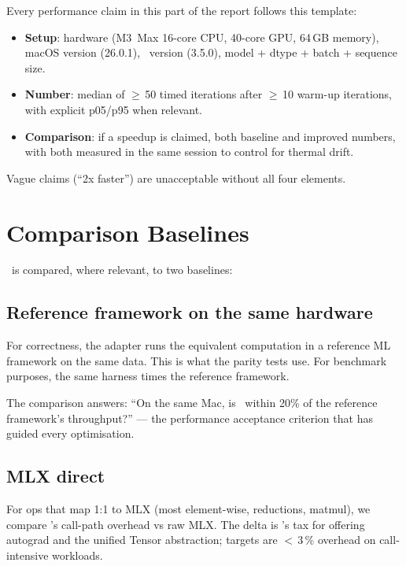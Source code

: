 Every performance claim in this part of the report follows this
template:

\begin{itemize}
  \item \textbf{Setup}: hardware (M3~Max 16-core CPU, 40-core
    GPU, 64\,GB memory), macOS version (26.0.1), \Lucid\
    version (3.5.0), model + dtype + batch + sequence size.
  \item \textbf{Number}: median of $\geq$\,50 timed iterations
    after $\geq$\,10 warm-up iterations, with explicit p05/p95
    when relevant.
  \item \textbf{Comparison}: if a speedup is claimed, both
    baseline and improved numbers, with both measured in the
    same session to control for thermal drift.
\end{itemize}

Vague claims (``2x faster'') are unacceptable without all four
elements.

\section{Comparison Baselines}
\label{sec:perf_methodology:baselines}

\Lucid\ is compared, where relevant, to two baselines:

\subsection{Reference framework on the same hardware}
\label{ssec:perf_methodology:ref_framework}

For correctness, the 
adapter runs the equivalent computation in a reference ML
framework on the same data. This is what the parity tests use.
For benchmark purposes, the same harness times the reference
framework.

The comparison answers: ``On the same Mac, is \Lucid\ within
20\% of the reference framework's throughput?'' --- the
performance acceptance criterion that has guided every
optimisation.

\subsection{MLX direct}
\label{ssec:perf_methodology:mlx_direct}

For ops that map 1:1 to MLX (most element-wise, reductions,
matmul), we compare \Lucid's call-path overhead vs raw MLX. The
delta is \Lucid's tax for offering autograd and the unified
Tensor abstraction; targets are $<$\,3\,\% overhead on call-
intensive workloads.

